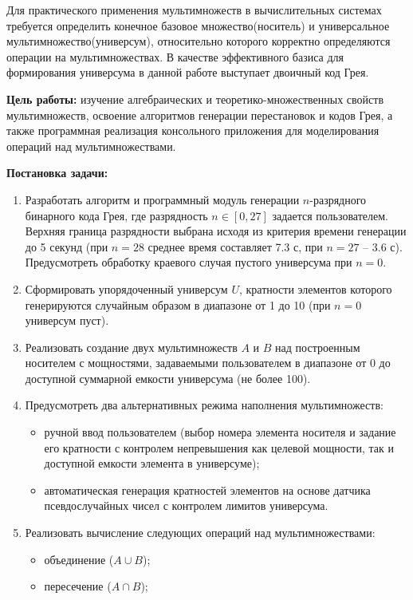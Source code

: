 \documentclass[14pt, a4paper]{extarticle}
\begin{document}
	Для практического применения мультимножеств в вычислительных системах требуется определить конечное базовое множество(носитель) и универсальное мультимножество(универсум), относительно которого корректно определяются операции на мультимножествах. В качестве эффективного базиса для формирования универсума в данной работе выступает двоичный код Грея.
	
	{\bf Цель работы:} изучение алгебраических и теоретико-множественных свойств мультимножеств, освоение алгоритмов генерации перестановок и кодов Грея, а также программная реализация консольного приложения для моделирования операций над мультимножествами.
	
	{\bf Постановка задачи:}
	\begin{enumerate}[label=\arabic*.]
				\item Разработать алгоритм и программный модуль генерации $n$-разрядного бинарного кода Грея, где разрядность $n \in [0, 27]$ задается пользователем. Верхняя граница разрядности выбрана исходя из критерия времени генерации до 5 секунд (при $n = 28$ среднее время составляет 7.3 с, при $n = 27$ -- 3.6 с). Предусмотреть обработку краевого случая пустого универсума при $n = 0$.
		\item Сформировать упорядоченный универсум $U$, кратности элементов которого генерируются случайным образом в диапазоне от 1 до 10 (при $n = 0$ универсум пуст).
		\item Реализовать создание двух мультимножеств $A$ и $B$ над построенным носителем с мощностями, задаваемыми пользователем в диапазоне от 0 до доступной суммарной емкости универсума (не более 100).
		\item Предусмотреть два альтернативных режима наполнения мультимножеств:
		\begin{itemize}
			\item ручной ввод пользователем (выбор номера элемента носителя и задание его кратности с контролем непревышения как целевой мощности, так и доступной емкости элемента в универсуме);
			\item автоматическая генерация кратностей элементов на основе датчика псевдослучайных чисел с контролем лимитов универсума.
		\end{itemize}
		\item Реализовать вычисление следующих операций над мультимножествами:
		\begin{itemize}
			\item объединение ($A \cup B$);
			\item пересечение ($A \cap B$);

\end{itemize}
\end{enumerate}
\end{document}
